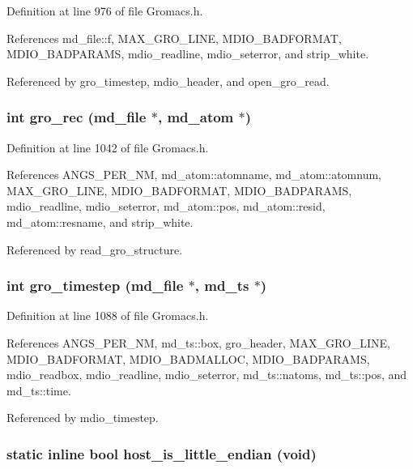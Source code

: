 Definition at line 976 of file Gromacs.h.

References md\_\-file::f, MAX\_\-GRO\_\-LINE, MDIO\_\-BADFORMAT, MDIO\_\-BADPARAMS, mdio\_\-readline, mdio\_\-seterror, and strip\_\-white.

Referenced by gro\_\-timestep, mdio\_\-header, and open\_\-gro\_\-read.
\subsubsection{\setlength{\rightskip}{0pt plus 5cm}int gro\_\-rec ({\bf md\_\-file} $\ast$, {\bf md\_\-atom} $\ast$)\hspace{0.3cm}{\tt  [static]}}\label{Gromacs_8h_a41}




Definition at line 1042 of file Gromacs.h.

References ANGS\_\-PER\_\-NM, md\_\-atom::atomname, md\_\-atom::atomnum, MAX\_\-GRO\_\-LINE, MDIO\_\-BADFORMAT, MDIO\_\-BADPARAMS, mdio\_\-readline, mdio\_\-seterror, md\_\-atom::pos, md\_\-atom::resid, md\_\-atom::resname, and strip\_\-white.

Referenced by read\_\-gro\_\-structure.
\subsubsection{\setlength{\rightskip}{0pt plus 5cm}int gro\_\-timestep ({\bf md\_\-file} $\ast$, {\bf md\_\-ts} $\ast$)\hspace{0.3cm}{\tt  [static]}}\label{Gromacs_8h_a42}




Definition at line 1088 of file Gromacs.h.

References ANGS\_\-PER\_\-NM, md\_\-ts::box, gro\_\-header, MAX\_\-GRO\_\-LINE, MDIO\_\-BADFORMAT, MDIO\_\-BADMALLOC, MDIO\_\-BADPARAMS, mdio\_\-readbox, mdio\_\-readline, mdio\_\-seterror, md\_\-ts::natoms, md\_\-ts::pos, and md\_\-ts::time.

Referenced by mdio\_\-timestep.
\subsubsection{\setlength{\rightskip}{0pt plus 5cm}static inline bool host\_\-is\_\-little\_\-endian (void)\hspace{0.3cm}{\tt  [inline, static]}}\label{Gromacs_8h_a65}


